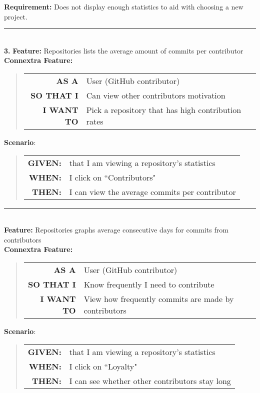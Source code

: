 \documentclass[12pt]{article}
\newcommand{\Requirement}[1] {
   \noindent \textbf{Requirement:} #1
}
\newcommand{\Feature}[1]{ 
   \noindent \textbf{Feature:} #1
}
\newcommand{\CFeature}[4]{
\noindent \textbf{Connextra Feature:}
	\begin{quote}
	\begin{tabular}{rl}
	\textbf{AS A} & #1\\
	\textbf{SO THAT \uppercase{#2}} & #3\\
	\textbf{\uppercase{#2} WANT TO} & #4  
	\end{tabular}
	\end{quote}
}
\newcommand{\GivenSc} {
	\noindent \textbf{GIVEN:}
	}
\newcommand{\WhenSc} {
	\noindent \textbf{WHEN:}
	}
\newcommand{\AndSc} {
	\noindent \textbf{AND:}
	}
\newcommand{\ThenSc} {
	\noindent \textbf{THEN:}
	}
\begin{document}
\begin{framed}
\Requirement{Does not display enough statistics to aid with choosing a new project.}\\[0.2cm]

\hrule~\\

\noindent  \textbf{3.}\Feature{Repositories lists the average amount of commits per contributor}\\[0.2cm]

\CFeature{User (\textsf{GitHub} contributor)}{I}{Can view other contributors motivation}{Pick a repository that has high contribution rates}

\noindent \textbf{Scenario}:
\begin{quote}
\begin{tabular}{rl}
\GivenSc & that I am viewing a repository's statistics\\
\WhenSc & I click on ``Contributors"\\
\ThenSc & I can view the average commits per contributor
\end{tabular}
\end{quote}

\hrule~\\

\Feature{Repositories graphs average consecutive days for commits from contributors}\\[0.4cm]

\CFeature{User (\textsf{GitHub} contributor)}{I}{Know frequently I need to contribute}{View how frequently commits are made by contributors}

\noindent \textbf{Scenario}:
\begin{quote}
\begin{tabular}{rl}
\GivenSc & that I am viewing a repository's statistics\\
\WhenSc & I click on ``Loyalty"\\
\ThenSc & I can see whether other contributors stay long
\end{tabular}
\end{quote}
\end{framed}
\end{document}
